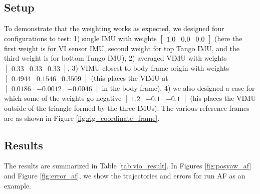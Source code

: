 \documentclass[conference]{IEEEtran}
\begin{document}


\subsection{Setup}

To demonstrate that the weighting works as expected, we designed four configurations to test: 1) single IMU with weights $[\begin{matrix} 1.0 & 0.0 & 0.0 \end{matrix}]$ (here the first weight is for VI sensor IMU, second weight for top Tango IMU, and the third weight is for bottom Tango IMU), 2) averaged VIMU with weights $[\begin{matrix} 0.33 & 0.33 & 0.33 \end{matrix}]$, 3) VIMU closest to body frame origin with weights $[\begin{matrix} 0.4944 & 0.1546 & 0.3509 \end{matrix}]$ (this places the VIMU at $[\begin{matrix} 0.0186 & -0.0012 & -0.0046 \end{matrix}]$ in the body frame), 4) we also designed a case for which some of the weights go negative $[\begin{matrix} 1.2 & -0.1 & -0.1 \end{matrix}]$ (his places the VIMU outside of the triangle formed by the three IMUs). The various reference frames are as shown in Figure \ref{fig:rig_coordinate_frame}.

\subsection{Results}

The results are summarized in Table \ref{tab:vio_result}. In Figures \ref{fig:posyaw_af} and Figure \ref{fig:error_af}, we show the trajectories and errors for run AF as an example.

\end{document}
